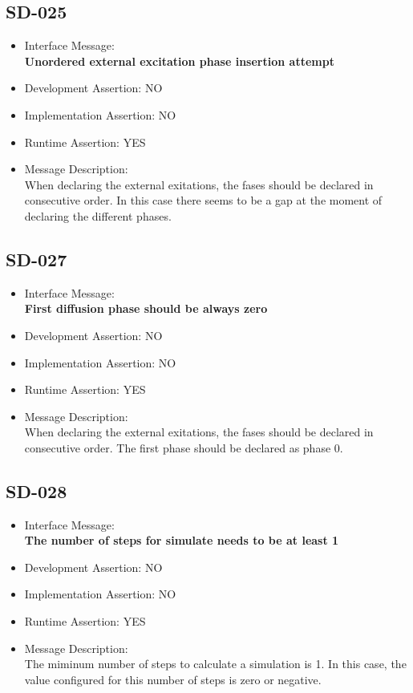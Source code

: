\subsection{SD-025}
\begin{itemize}
  \item Interface Message:\\[1em]
    \textbf{Unordered external excitation phase insertion attempt}
  \item Development Assertion: NO
  \item Implementation Assertion: NO
  \item Runtime Assertion: YES
  \item Message Description:\\[1em]
    When declaring the external exitations, the fases should be declared in consecutive order. In this case there seems to be a gap at the moment of declaring the different phases.
\end{itemize}

\subsection{SD-027}
\begin{itemize}
  \item Interface Message:\\[1em]
    \textbf{First diffusion phase should be always zero}
  \item Development Assertion: NO
  \item Implementation Assertion: NO
  \item Runtime Assertion: YES
  \item Message Description:\\[1em]
    When declaring the external exitations, the fases should be declared in consecutive order. The first phase should be declared as phase 0.
\end{itemize}

\subsection{SD-028}
\begin{itemize}
  \item Interface Message:\\[1em]
    \textbf{The number of steps for simulate needs to be at least 1}
  \item Development Assertion: NO
  \item Implementation Assertion: NO
  \item Runtime Assertion: YES
  \item Message Description:\\[1em]
    The miminum number of steps to calculate a simulation is 1. In this case, the value configured for this number of steps is zero or negative.
\end{itemize}

